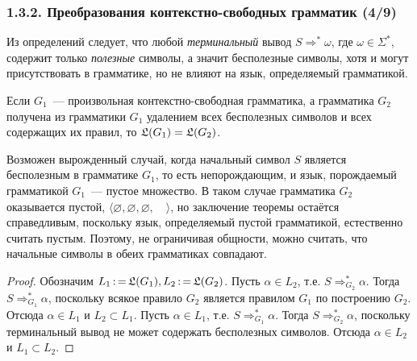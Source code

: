 \documentclass[mathserif,12pt,aspectratio=169]{beamer}
\def\emразделенной{\em разделенной}
\def\em#1{\it\color{blue}#1}
\let\emptyset\varnothing
\def\Assign{\operatorname{:=}}
\begin{document}
\begin{frame}
\frametitle{1.3.2. Преобразования контекстно-свободных грамматик (4/9)}

Из определений следует, что  любой {\em терминальный} 
вывод $S \Rightarrow^* \omega$, где $\omega\in \Sigma^*$, 
содержит только {\em полезные} символы, а значит бесполезные символы, хотя и могут присутствовать в
грамматике, но не влияют на язык, определяемый грамматикой. 

\begin{theorem}
Если $G_1$~--- произвольная контекстно-свободная 
грамматика, а грамматика $G_2$ получена из грамматики
$G_1$ удалением всех бесполезных символов и всех содержащих их правил, то $\frak{L}(G_1)=\frak{L}(G_2)$. 
\end{theorem}

\begin{remark}
Возможен вырожденный случай, когда начальный 
символ $S$ является бесполезным
в грамматике $G_1$, то есть непорождающим,
и язык, порождаемый грамматикой $G_1$~--- пустое множество. В таком случае 
грамматика $G_2$ оказывается пустой, $\langle\emptyset,
\emptyset, \emptyset, \quad\rangle$,
но заключение теоремы остаётся справедливым,
поскольку язык, определяемый пустой 
грамматикой, естественно считать пустым.
Поэтому, не ограничивая общности,
можно считать, что начальные символы
в обеих грамматиках совпадают.  
\end{remark}

\begin{proof}
Обозначим $L_1\Assign\frak{L}(G_1), L_2\Assign\frak{L}(G_2)$. 
Пусть $\alpha\in L_2$, т.е. $S\Rightarrow^*_{G_2} \alpha$.
Тогда $S\Rightarrow^*_{G_1} \alpha$, поскольку всякое
правило $G_2$ является правилом $G_1$ по построению $G_2$.
Отсюда $\alpha\in L_1$ и $L_2\subset L_1$.
Пусть $\alpha\in L_1$, т.е. $S\Rightarrow^*_{G_1} \alpha$.
Тогда $S\Rightarrow^*_{G_2} \alpha$, поскольку терминальный вывод не может содержать бесполезных символов.
Отсюда $\alpha\in L_2$ и $L_1\subset L_2$.
\end{proof}

\end{frame}
\end{document}
